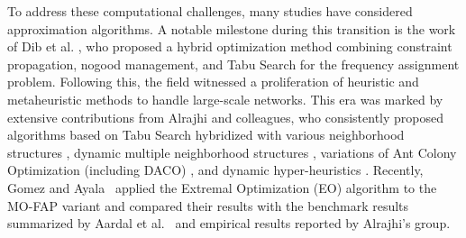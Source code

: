 \documentclass[letterpaper,journal]{IEEEtran}
\begin{document}
To address these computational challenges, many studies have considered approximation algorithms.
A notable milestone during this transition is the work of Dib et al. \cite{Dib2009}, who proposed a hybrid optimization method combining constraint propagation, nogood management, and Tabu Search for the frequency assignment problem.
Following this, the field witnessed a proliferation of heuristic and metaheuristic methods to handle large-scale networks.
This era was marked by extensive contributions from Alrajhi and colleagues, who consistently proposed algorithms based on Tabu Search hybridized with various neighborhood structures \cite{Alrajhi2016_Hybridized}, dynamic multiple neighborhood structures \cite{Alrajhi2023Neighborhood}, variations of Ant Colony Optimization (including DACO) \cite{Alrajhi2023AntMetaheuristic, Alrajhi2023DynamicACO}, and dynamic hyper-heuristics \cite{Alrajhi2023DynamicHyper}.
Recently, Gomez and Ayala~\cite{Gomez2023MO} applied the Extremal Optimization (EO) algorithm to the MO-FAP variant and compared their results with the benchmark results summarized by Aardal et al.~\cite{Aardal2007} and empirical results reported by Alrajhi's group.
\end{document}
